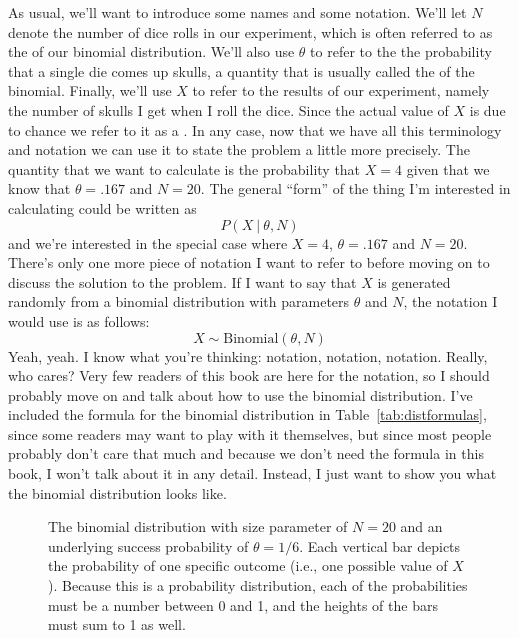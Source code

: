 As usual, we'll want to introduce some names and some notation. We'll let $N$ denote the number of dice rolls in our experiment, which is often referred to as the  of our binomial distribution. We'll also use $\theta$ to refer to the the probability that a single die comes up skulls, a quantity that is usually called the  of the binomial. Finally, we'll use $X$ to refer to the results of our experiment, namely the number of skulls I get when I roll the dice. Since the actual value of $X$ is due to chance we refer to it as a . In any case, now that we have all this terminology and notation we can use it to state the problem a little more precisely. The quantity that we want to calculate is the probability that $X = 4$ given that we know that $\theta = .167$ and $N=20$. The general ``form'' of the thing I'm interested in calculating could be written as 
$$
P(X \ | \ \theta, N)
$$
and we're interested in the special case where $X=4$, $\theta = .167$ and $N=20$. 
There's only one more piece of notation I want to refer to before moving on to discuss the solution to the problem. If I want to say that $X$ is generated randomly from a binomial distribution with parameters $\theta$ and $N$, the notation I would use is as follows:
$$
X \sim \mbox{Binomial}(\theta, N)
$$ 
Yeah, yeah. I know what you're thinking: notation, notation, notation. Really, who cares? Very few readers of this book are here for the notation, so I should probably move on and talk about how to use the binomial distribution. I've included the formula for the binomial distribution in Table~\ref{tab:distformulas}, since some readers may want to play with it themselves, but since most people probably don't care that much and because we don't need the formula in this book, I won't talk about it in any detail. Instead, I just want to show you what the binomial distribution looks like. 

\begin{figure}[!!htb]
\begin{center}
\caption{The binomial distribution with size parameter of $N=20$ and an underlying success probability of $\theta = 1/6$. Each vertical bar depicts the probability of one specific outcome (i.e., one possible value of $X$). Because this is a probability distribution, each of the probabilities must be a number between 0 and 1, and the heights of the bars must sum to 1 as well.}
\label{fig:binomial1}
\end{center}
\end{figure}

